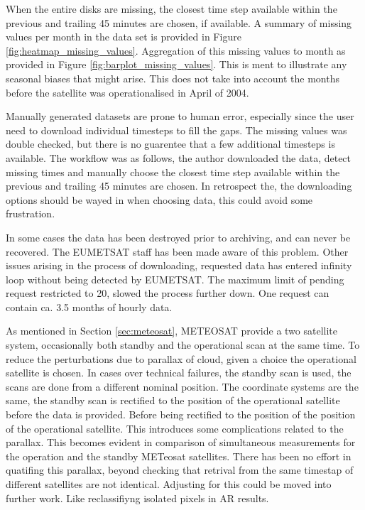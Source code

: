When the entire disks are missing, the closest time step available within the previous and trailing 45 minutes are chosen, if available. A summary of missing values per month in the data set is provided in Figure \ref{fig:heatmap_missing_values}. Aggregation of this missing values to month as provided in Figure \ref{fig:barplot_missing_values}. This is ment to illustrate any seasonal biases that might arise. This does not take into account the months before the satellite was operationalised in April of  2004. 

Manually generated datasets are prone to human error, especially since the user need to download individual timesteps to fill the gaps. The missing values was double checked, but there is no guarentee that a few additional timesteps is available. The workflow was as follows, the author downloaded the data, detect missing times and manually choose the closest time step available within the previous and trailing 45 minutes are chosen. 
In retrospect the, the downloading options should be wayed in when choosing data, this could avoid some frustration.

In some cases the data has been destroyed prior to archiving, and can never be recovered. The EUMETSAT staff has been made aware of this problem. Other issues arising in the process of downloading, requested data has entered infinity loop without being detected by EUMETSAT. The maximum limit of  pending request restricted to 20, slowed the process further down. One request can contain ca. 3.5 months of hourly data. 

As mentioned in Section \ref{sec:meteosat}, METEOSAT provide a two satellite system, occasionally both standby and the operational scan at the same time. To reduce the perturbations due to parallax of cloud, given a choice the operational satellite is chosen. In cases over technical failures, the standby scan is used, the scans are done from a different nominal position. The coordinate systems are the same, the standby scan is rectified to the position of the operational satellite before the data is provided. 
Before being rectified to the position of the position of the operational satellite. This introduces some complications related to the parallax. This becomes evident in comparison of simultaneous measurements for the operation and the standby METeosat satellites. There has been no effort in quatifing this parallax, beyond checking that retrival from the same timestap of different satellites are not identical. Adjusting for this could be moved into further work. Like reclassifiyng isolated pixels in AR results.

